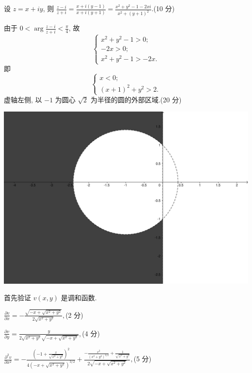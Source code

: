 \documentclass{homework}
\begin{document}
\maketitle

设 \(z=x+iy\), 则 \(\frac{z-i}{z+i}=\frac{x+i(y-1)}{x+i(y+1)}=\frac{x^2+y^2-1-2xi}{x^2+(y+1)^2}\).\hfill (10 分)

由于 \(0<\arg\frac{z-i}{z+i}<\frac{\pi}{4}\), 故
\[\begin{cases}x^2+y^2-1>0;\\-2x>0;\\x^2+y^2-1>-2x.\end{cases}\]
即
\[\begin{cases}x<0;\\(x+1)^2+y^2>2.\end{cases}\]
虚轴左侧, 以 \(-1\) 为圆心 \(\sqrt{2}\) 为半径的圆的外部区域.\hfill (20 分)

\begin{center}
  \includegraphics[width=.72\columnwidth]{figure/1.pdf}
\end{center}



首先验证 \(v(x, y)\) 是调和函数.

\(\frac{\partial v}{\partial x}=-\frac{\sqrt{-x+\sqrt{x^2+y^2}}}{2 \sqrt{x^2+y^2}},\)\hfill (2 分)

\(\frac{\partial v}{\partial y}=\frac{y}{2 \sqrt{x^2+y^2} \sqrt{-x+\sqrt{x^2+y^2}}},\)\hfill (4 分)

\(\frac{\partial^2 v}{\partial x^2}=-\frac{\left(-1+\frac{x}{\sqrt{x^2+y^2}}\right)^2}{4 \left(-x+\sqrt{x^2+y^2}\right)^{3/2}}+\frac{-\frac{x^2}{\left(x^2+y^2\right)^{3/2}}+\frac{1}{\sqrt{x^2+y^2}}}{2 \sqrt{-x+\sqrt{x^2+y^2}}},\)\hfill (5 分)
\end{document}
